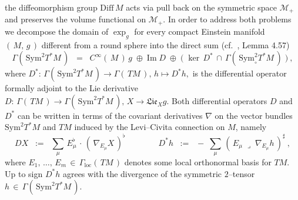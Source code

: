 \documentclass[12pt]{article}
\def\#{\sharp}
\def\b{\flat}
\def\Im{\mathrm{Im}}
\def\ins{\lrcorner}
\def\M{\mathscr{M}}
\def\S{\mathrm{Sym}}
\begin{document}
 the diffeomorphism group $\mathrm{Diff}\,M$ acts via pull back on the
 symmetric space $\M_+$ and preserves the volume functional on $\M_+$.
 In order to address both problems we decompose the domain of $\exp_g$
 for every compact Einstein manifold $(\,M,\,g\,)$ different from a round
 sphere into the direct sum (cf.~\cite{B87}, Lemma 4.57)
 \begin{equation}\label{deco}
  \Gamma(\,\S^2T^*M\,)
  \;\;=\;\;
  C^\infty(\,M\,)\,g\;\oplus\;\Im\;D\;\oplus\;
  \bigg(\;\ker\,D^*\,\cap\,\Gamma(\,\S^2_\circ T^*M\,)\;\bigg)\ ,
 \end{equation}
 where $D^*:\,\Gamma(\,\S^2T^*M\,)\longrightarrow\Gamma(\,TM\,),\,h\longmapsto
 D^*h,$ is the differential operator formally adjoint to the Lie derivative
 $D:\,\Gamma(\,TM\,)\longrightarrow\Gamma(\,\S^2T^*M\,),\,X\longrightarrow
 \mathfrak{Lie}_Xg$. Both differential operators $D$ and $D^*$ can be written
 in terms of the covariant derivatives $\nabla$ on the vector bundles
 $\S^2T^*M$ and $TM$ induced by the Levi--Civita connection on $M$, namely
 \begin{equation}\label{ll*}
  D X
  \;\;:=\;\;
  \sum_\mu\,E_\mu^\b\,\cdot\,(\,\nabla_{E_\mu}X\,)^\b
  \qquad\qquad
  D^*h
  \;\;:=\;\;
  -\;\sum_\mu\,(\,E_\mu\;\ins\;\nabla_{E_\mu}h\,)^\#\ ,
 \end{equation}
 where $E_1,\,\ldots,\,E_m\,\in\,\Gamma_{\mathrm{loc}}(\,TM\,)$ denotes
 some local orthonormal basis for $TM$. Up to sign $D^*h$ agrees with
 the divergence of the symmetric $2$--tensor $h\,\in\,\Gamma(\,\S^2T^*M\,)$.
 
\end{document}
